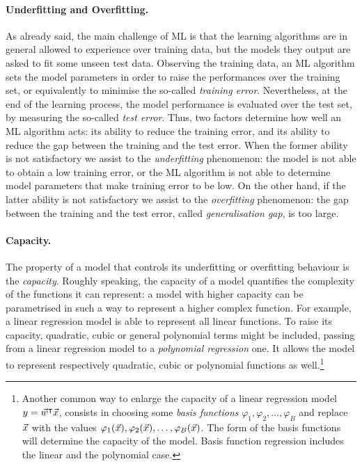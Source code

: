 \paragraph*{Underfitting and Overfitting.} As already said, the main challenge of ML is that the learning algorithms are in general allowed to experience over training data, but the models they output are asked to fit some unseen test data. Observing the training data, an ML algorithm sets the model parameters in order to raise the performances over the training set, or equivalently to minimise the so-called \textit{training error}. Nevertheless, at the end of the learning process, the model performance is evaluated over the test set, by measuring the so-called \textit{test error}. Thus, two factors determine how well an ML algorithm acts: its ability to reduce the training error, and its ability to reduce the gap between the training and the test error. When the former ability is not satisfactory we assist to the \emph{underfitting} phenomenon: the model is not able to obtain a low training error, or the ML algorithm is not able to determine model parameters that make training error to be low. On the other hand, if the latter ability is not satisfactory we assist to the \emph{overfitting} phenomenon: the gap between the training and the test error, called \emph{generalisation gap}, is too large. \\

\paragraph*{Capacity.}The property of a model that controls its underfitting or overfitting behaviour is the \emph{capacity}. Roughly speaking, the capacity of a model quantifies the complexity of the functions it can represent: a model with higher capacity can be parametrised in such a way to represent a higher complex function. For example, a linear regression model is able to represent all linear functions. To raise its capacity, quadratic, cubic or general polynomial terms might be included, passing from a linear regression model to a \emph{polynomial regression} one. It allows the model to represent respectively quadratic, cubic or polynomial functions as well.\footnote{Another common way to enlarge the capacity of a linear regression model $y = \vec{w}^\intercal \vec{x}$,  consists in choosing some \emph{basis functions} $\varphi_1, \varphi_2,\dots, \varphi_B$ and replace $\vec{x}$ with the values $\varphi_1(\vec{x}), \varphi_2(\vec{x}),\dots, \varphi_B(\vec{x})$. The form of the basis functions will determine the capacity of the model. Basis function regression includes the linear and the polynomial case.} \\

